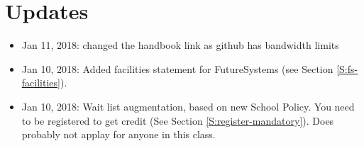 
\chapter{Updates}

\begin{itemize}

\item Jan 11, 2018: changed the handbook link as github has bandwidth limits

\item Jan 10, 2018: Added facilities statement for FutureSystems
  (see Section \ref{S:fs-facilities}).

\item Jan 10, 2018:  Wait list augmentation, based on new School
  Policy. You need to be registered to get credit (See Section
  \ref{S:register-mandatory}). Does probably not applay for anyone in
  this class. 

\end{itemize}
